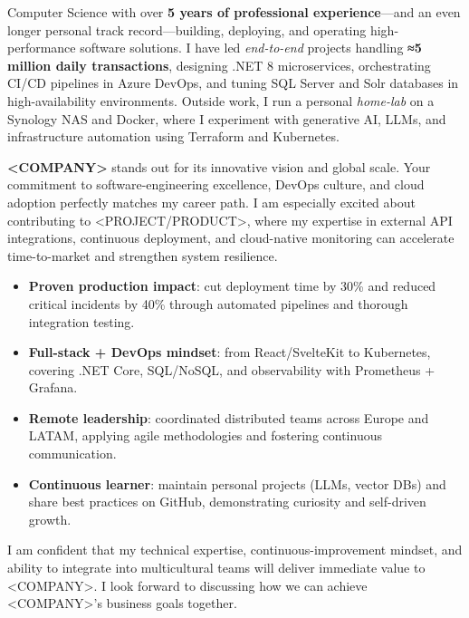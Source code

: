 \documentclass[11pt,a4paper]{awesome-cv}
\begin{document}
\begin{cvletter}

  Computer Science with over \textbf{5 years of professional experience}—and an even longer personal track record—building, deploying, and operating high-performance software solutions.  
  I have led \textit{end-to-end} projects handling \textbf{≈5 million daily transactions}, designing .NET 8 microservices, orchestrating CI/CD pipelines in Azure DevOps, and tuning SQL Server and Solr databases in high-availability environments.  
  Outside work, I run a personal \textit{home-lab} on a Synology NAS and Docker, where I experiment with generative AI, LLMs, and infrastructure automation using Terraform and Kubernetes.

  \textbf{<COMPANY>} stands out for its innovative vision and global scale. Your commitment to software-engineering excellence, DevOps culture, and cloud adoption perfectly matches my career path.  
  I am especially excited about contributing to <PROJECT/PRODUCT>, where my expertise in external API integrations, continuous deployment, and cloud-native monitoring can accelerate time-to-market and strengthen system resilience.

  \begin{itemize}
      \item \textbf{Proven production impact}: cut deployment time by 30\% and reduced critical incidents by 40\% through automated pipelines and thorough integration testing.
      \item \textbf{Full-stack + DevOps mindset}: from React/SvelteKit to Kubernetes, covering .NET Core, SQL/NoSQL, and observability with Prometheus + Grafana.
      \item \textbf{Remote leadership}: coordinated distributed teams across Europe and LATAM, applying agile methodologies and fostering continuous communication.
      \item \textbf{Continuous learner}: maintain personal projects (LLMs, vector DBs) and share best practices on GitHub, demonstrating curiosity and self-driven growth.
  \end{itemize}

  I am confident that my technical expertise, continuous-improvement mindset, and ability to integrate into multicultural teams will deliver immediate value to <COMPANY>.  
  I look forward to discussing how we can achieve <COMPANY>'s business goals together.

\end{cvletter}

\makeletterclosing
\end{document}
